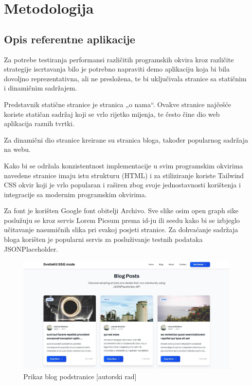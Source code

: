 \section{Metodologija}

\subsection{Opis referentne aplikacije}

Za potrebe testiranja performansi različitih programskih okvira kroz različite strategije iscrtavanja bilo je potrebno napraviti demo aplikaciju koja bi bila dovoljno reprezentativna, ali ne presložena, te bi uključivala stranice sa statičnim i dinamičnim sadržajem.

\bigskip

Predstavnik statične stranice je stranica „o nama“. Ovakve stranice najčešće koriste statičan sadržaj koji se vrlo rijetko mijenja, te često čine dio web aplikacija raznih tvrtki.

\bigskip
Za dinamični dio stranice kreirane su stranica bloga, također popularnog sadržaja na webu.

\bigskip

Kako bi se održala konzistentnost implementacije u svim programskim okvirima navedene stranice imaju istu strukturu (HTML) i za stiliziranje koriste Tailwind CSS okvir koji je vrlo popularan i raširen zbog svoje jednostavnosti korištenja i integracije sa modernim programskim okvirima.

\bigskip

Za font je korišten Google font obitelji Archivo. Sve slike osim open graph sike poslužuju se kroz servis Lorem Picsum prema id-ju ili seedu kako bi se izbjeglo učitavanje nasumičnih slika pri svakoj posjeti stranice. Za dohvaćanje sadržaja bloga korišten je popularni servis za posluživanje testnih podataka JSONPlaceholder.

\bigskip

\begin{figure}[H]
    \centering
    \includegraphics[width=\textwidth]{slike/prikaz-blog-stranice.jpg}
    \caption{Prikaz blog podstranice [autorski rad]}
    \label{fig:prikaz-blog-stranice}
\end{figure}

